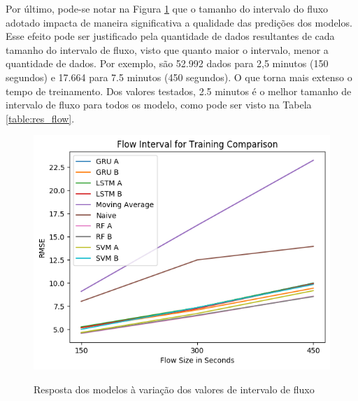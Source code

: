 Por último, pode-se notar na Figura \ref{figure:res_flow} que o tamanho do intervalo do fluxo adotado impacta de maneira significativa a qualidade das predições dos modelos. Esse efeito pode ser justificado pela quantidade de dados resultantes de cada tamanho do intervalo de fluxo, visto que quanto maior o intervalo, menor a quantidade de dados. Por exemplo, são 52.992 dados para 2,5 minutos (150 segundos) e 17.664 para 7.5 minutos (450 segundos). O que torna mais extenso o tempo de treinamento. Dos valores testados, 2.5 minutos é o melhor tamanho de intervalo de fluxo para todos os modelo, como pode ser visto na Tabela \ref{table:res_flow}.

\begin{figure}[H]
    \centering
    \includegraphics[scale=0.8]{monography/img/flow_interval_for_training_comparison_rmse.png}
    \label{figure:res_flow}
    \caption{Resposta dos modelos à variação dos valores de intervalo de fluxo}
\end{figure}

